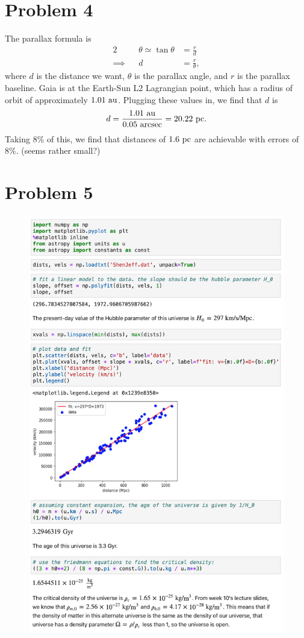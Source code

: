 \documentclass[11pt,letterpaper]{article}
\begin{document}
\section*{Problem 4}

The parallax formula is 
\begin{alignat*}{2}
    &&\theta \simeq \tan{\theta} &= \frac{r}{d} \\
    \implies&& d &= \frac{r}{\theta},
\end{alignat*}
where $d$ is the distance we want, $\theta$ is the parallax angle, and $r$ is the parallax baseline. Gaia is at the Earth-Sun L2 Lagrangian point, which has a radius of orbit of approximately $1.01~{\rm au}$. Plugging these values in, we find that $d$ is 
\begin{align*}
    d = \frac{1.01~{\rm au}}{0.05~{\rm arcsec}} = 20.22~{\rm pc}.
\end{align*}
{Taking 8\% of this, we find that distances of $1.6~{\rm pc}$ are achievable with errors of 8\%. {\tiny(seems rather small?)}}

\newpage

\section*{Problem 5}

\begin{figure}[!htbp]
    \centering
    \includegraphics[width=0.7\linewidth]{q5.png}
\end{figure}
\end{document}
